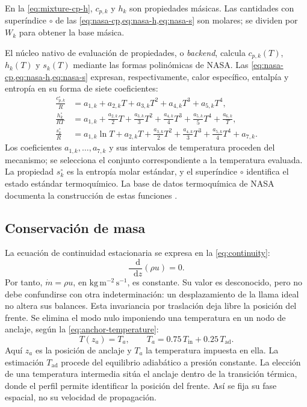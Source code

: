 \documentclass[12pt,a4paper,twoside,openany]{book}
\newcommand{\dd}{\mathop{}\!\mathrm{d}}
\newcommand{\Tin}{T_{\mathrm{in}}}
\newcommand{\Tad}{T_{\mathrm{ad}}}
\begin{document}
En la \cref{eq:mixture-cp-h}, \(c_{p,k}\) y \(h_k\) son propiedades másicas.
Las cantidades con superíndice \(\circ\) de las
\cref{eq:nasa-cp,eq:nasa-h,eq:nasa-s} son molares; se dividen por \(W_k\)
para obtener la base másica.

El núcleo nativo de evaluación de propiedades, o \emph{backend}, calcula
\(c_{p,k}(T)\), \(h_k(T)\) y \(s_k(T)\) mediante las
formas polinómicas de NASA. Las \cref{eq:nasa-cp,eq:nasa-h,eq:nasa-s}
expresan, respectivamente, calor específico, entalpía y entropía en su forma
de siete coeficientes:
\begin{align}
  \frac{c_{p,k}^{\circ}}{R} & =a_{1,k}+a_{2,k}T+a_{3,k}T^2+a_{4,k}T^3+a_{5,k}T^4,
  \label{eq:nasa-cp}\\
  \frac{h_k^{\circ}}{RT} & =a_{1,k}+\frac{a_{2,k}}{2}T
  +\frac{a_{3,k}}{3}T^2+\frac{a_{4,k}}{4}T^3
  +\frac{a_{5,k}}{5}T^4+\frac{a_{6,k}}{T},
  \label{eq:nasa-h}\\
  \frac{s_k^{\circ}}{R} & =a_{1,k}\ln T+a_{2,k}T
  +\frac{a_{3,k}}{2}T^2+\frac{a_{4,k}}{3}T^3
  +\frac{a_{5,k}}{4}T^4+a_{7,k}.
  \label{eq:nasa-s}
\end{align}
Los coeficientes \(a_{1,k},\ldots,a_{7,k}\) y sus intervalos de temperatura
proceden del mecanismo; se selecciona el conjunto correspondiente a la
temperatura evaluada. La propiedad \(s_k^\circ\) es la entropía molar estándar,
y el superíndice \(\circ\) identifica el estado estándar termoquímico. La base de
datos termoquímica de NASA documenta la construcción de estas funciones
\cite{McBride2002}.

\subsection{Conservación de masa}

La ecuación de continuidad estacionaria se expresa en la \cref{eq:continuity}:
\begin{equation}
  \frac{\dd}{\dd z}(\rho u)=0.
  \label{eq:continuity}
\end{equation}
Por tanto, \(\dot m=\rho u\), en \(\mathrm{kg\,m^{-2}\,s^{-1}}\), es
constante. Su valor es desconocido, pero no debe confundirse con otra
indeterminación: un desplazamiento de la llama ideal no altera sus balances.
Esta invariancia por traslación deja libre la posición del frente. Se elimina el modo nulo imponiendo una
temperatura en un nodo de anclaje, según la \cref{eq:anchor-temperature}:
\begin{equation}
  T(z_a)=T_a,
  \qquad
  T_a=0.75\,\Tin+0.25\,\Tad.
  \label{eq:anchor-temperature}
\end{equation}
Aquí \(z_a\) es la posición de anclaje y \(T_a\) la temperatura impuesta en
ella. La estimación \(\Tad\) procede del equilibrio adiabático a presión
constante. La elección de una temperatura intermedia sitúa el anclaje dentro
de la transición térmica, donde el perfil permite identificar la posición
del frente. Así se fija su fase espacial, no su velocidad de propagación.
\end{document}
